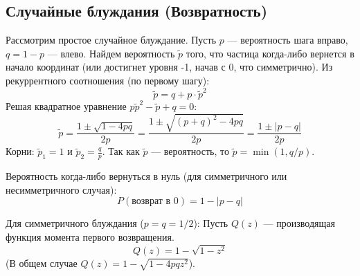 \subsection{Случайные блуждания (Возвратность)}

Рассмотрим простое случайное блуждание. Пусть $p$ --- вероятность шага вправо, $q=1-p$ --- влево.
Найдем вероятность $\tilde{p}$ того, что частица когда-либо вернется в начало координат (или достигнет уровня -1, начав с 0, что симметрично).
Из рекуррентного соотношения (по первому шагу):
$$ \tilde{p} = q + p \cdot \tilde{p}^2 $$
Решая квадратное уравнение $p\tilde{p}^2 - \tilde{p} + q = 0$:
$$ \tilde{p} = \frac{1 \pm \sqrt{1 - 4pq}}{2p} = \frac{1 \pm \sqrt{(p+q)^2 - 4pq}}{2p} = \frac{1 \pm |p-q|}{2p} $$
Корни: $\tilde{p}_1 = 1$ и $\tilde{p}_2 = \frac{q}{p}$.
Так как $\tilde{p}$ --- вероятность, то $\tilde{p} = \min(1, q/p)$.

\begin{statement}
Вероятность когда-либо вернуться в нуль (для симметричного или несимметричного случая):
$$ P(\text{возврат в } 0) = 1 - |p - q| $$
\end{statement}

\begin{example}
Для симметричного блуждания ($p=q=1/2$):
Пусть $Q(z)$ --- производящая функция момента первого возвращения.
$$ Q(z) = 1 - \sqrt{1 - z^2} $$
(В общем случае $Q(z) = 1 - \sqrt{1 - 4pqz^2}$).
\end{example}